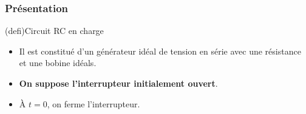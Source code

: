 \documentclass[../../main/main.tex]{subfiles}
\begin{document}
\subsubsection{Présentation}
\begin{tcb*}[sidebyside, righthand ratio=.30](defi){Circuit RC en charge}
	\begin{itemize}
		\item Il est constitué d'un générateur idéal de tension en série avec une
		      résistance et une bobine idéals.
		\item \textbf{On suppose l'interrupteur initialement ouvert}.
		\item À $t=0$, on ferme l'interrupteur.
	\end{itemize}
	\tcblower
	\begin{center}
		\label{fig:circ_rl-start}
	\end{center}
\end{tcb*}
\end{document}
